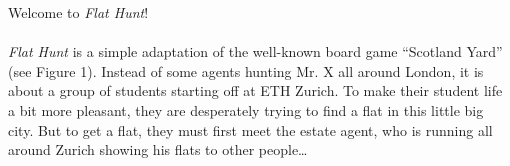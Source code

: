 Welcome to \emph{Flat Hunt}!

\paragraph{}
\emph{Flat Hunt} is a simple adaptation of the well-known board game ``Scotland Yard'' (see Figure 1). Instead of some agents hunting Mr. X all around London, it is about a group of students starting off at ETH Zurich. To make their student life a bit more pleasant, they are desperately trying to find a flat in this little big city. But to get a flat, they must first meet the estate agent, who is running all around Zurich showing his flats to other people\ldots

